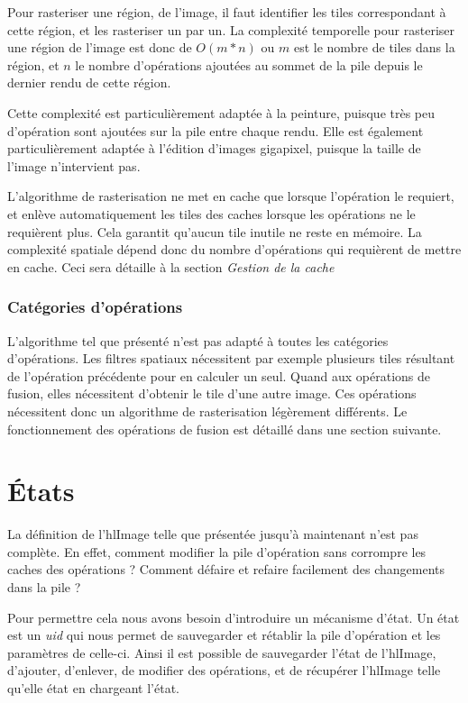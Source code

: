 		Pour rasteriser une région, de l'image, il faut identifier les tiles correspondant à cette région, et les rasteriser un par un. La complexité
		temporelle pour rasteriser une région de l'image est donc de $O(m*n)$ ou $m$ est le nombre de tiles dans la région, et $n$ le nombre d'opérations
		ajoutées au sommet de la pile depuis le dernier rendu de cette région. 

		Cette complexité est particulièrement adaptée à la peinture, puisque très peu d'opération sont ajoutées sur la pile entre chaque rendu.
		Elle est également particulièrement adaptée à l'édition d'images gigapixel, puisque la taille de l'image n'intervient pas. 
		
		L'algorithme de rasterisation ne met en cache que lorsque l'opération le requiert, et enlève automatiquement les tiles des caches lorsque
		les opérations ne le requièrent plus. Cela garantit qu'aucun tile inutile ne reste en mémoire. La complexité spatiale dépend donc du
		nombre d'opérations qui requièrent de mettre en cache. Ceci sera détaille à la section \emph{Gestion de la cache}
		
		\subsubsection{Catégories d'opérations}
		L'algorithme tel que présenté n'est pas adapté à toutes les catégories d'opé\-rations. Les filtres spatiaux nécessitent par exemple plusieurs tiles
		résultant de l'opération précédente pour en calculer un seul. Quand aux opérations de fusion, elles nécessitent d'obtenir le tile d'une
		autre image. Ces opérations nécessitent donc un algorithme de rasterisation légèrement différents. Le fonctionnement des opérations de fusion est détaillé
		dans une section suivante. 
		
	\section{États}
		La définition de l'hlImage telle que présentée jusqu'à maintenant n'est pas complète. En effet, comment modifier la pile d'opération sans
		corrompre les caches des opérations ? Comment défaire et refaire facilement des changements dans la pile ? 
		
		Pour permettre cela nous avons besoin d'introduire un mécanisme d'état. Un état est un \emph{uid} qui nous permet de sauvegarder et rétablir la
		pile d'opération et les paramètres de celle-ci. Ainsi il est possible de sauvegarder l'état de l'hlImage, d'ajouter, d'enlever, 
		de modifier des opérations, et de récupérer l'hlImage telle qu'elle état en chargeant l'état.

